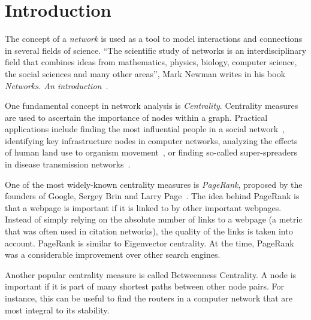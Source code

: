 
\chapter{Introduction}
\label{ch:Introduction}

The concept of a \emph{network} is used as a tool to model interactions and connections in several fields of science. ``The scientific study of networks \textelp{} is an interdisciplinary field that combines ideas from mathematics, physics, biology, computer science, the social sciences and many other areas'', Mark Newman writes in his book \emph{Networks. An introduction}~\cite{newmannetworks}.   

One fundamental concept in network analysis is \emph{Centrality}. Centrality measures are used to ascertain the importance of nodes within a graph. Practical applications include finding the most influential people in a social network~\cite{FREEMAN1978215}, identifying key infrastructure nodes in computer networks, analyzing the effects of human land use to organism movement~\cite{estrada2008using}, or finding so-called super-spreaders in disease transmission networks~\cite{dekker2013network}. 

One of the most widely-known centrality measures is \emph{PageRank}, proposed by the founders of Google, Sergey Brin and Larry Page~\cite{page1999pagerank}. The idea behind PageRank is that a webpage is important if it is linked to by other important webpages. Instead of simply relying on the absolute number of links to a webpage (a metric that was often used in citation networks), the quality of the links is taken into account. PageRank is similar to Eigenvector centrality. At the time, PageRank was a considerable improvement over other search engines.

Another popular centrality measure is called Betweenness Centrality. A node is important if it is part of many shortest paths between other node pairs. For instance, this can be useful to find the routers in a computer network that are most integral to its stability.

